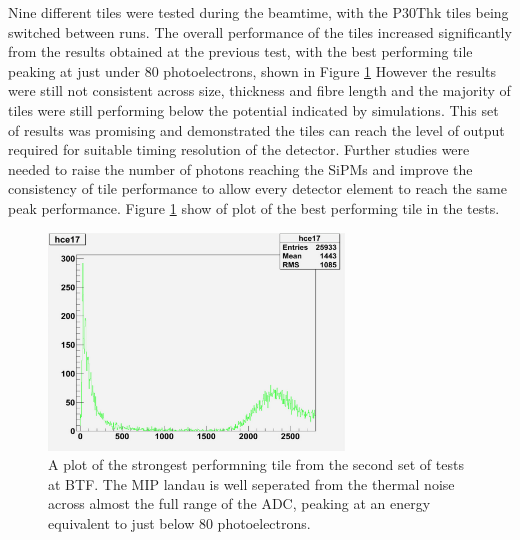Nine different tiles were tested during the beamtime, with the P30Thk tiles being switched between runs. The overall performance of the tiles increased significantly from the results obtained at the previous test, with the best performing tile peaking at just under 80 photoelectrons, shown in Figure \ref{Frascati2Results} However the results were still not consistent across size, thickness and fibre length and the majority of tiles were still performing below the potential indicated by simulations. This set of results was promising and demonstrated the tiles can reach the level of output required for suitable timing resolution of the detector. Further studies were needed to raise the number of photons reaching the SiPMs and improve the consistency of tile performance to allow every detector element to reach the same peak performance. Figure \ref{Frascati2Results} show of plot of the best performing tile in the tests.

\begin{figure}
	\centering
	\includegraphics[width=0.7\textwidth]{ImgChap1/frascati2results}
	\caption{A plot of the strongest performning tile from the second set of tests at BTF. The MIP landau is well seperated from the thermal noise across almost the full range of the ADC, peaking at an energy equivalent to just below 80 photoelectrons.}
	\label{Frascati2Results}
\end{figure}   